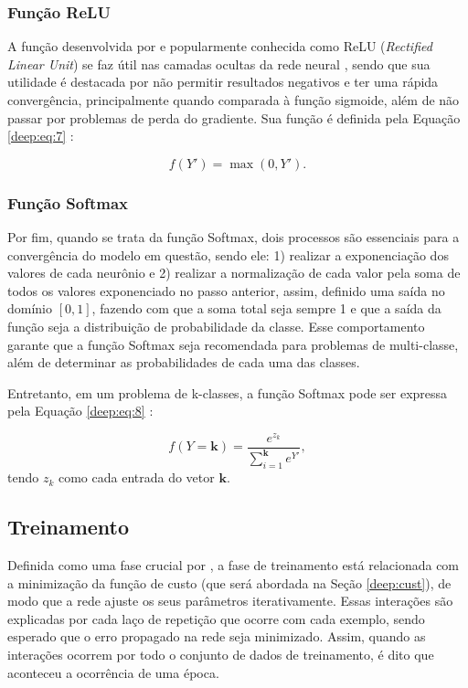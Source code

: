 \subsubsection{Função ReLU}
\label{deep:relu}
A função desenvolvida por \cite{Hahnioser2000} e popularmente conhecida como ReLU (\textit{Rectified Linear Unit}) se faz útil nas camadas ocultas da rede neural \citep{Goodfellow2016}, sendo que sua utilidade é destacada por não permitir resultados negativos \citep{Dahl2013} e ter uma rápida convergência, principalmente quando comparada à função sigmoide, além de não passar por problemas de perda do gradiente. Sua função é definida pela Equação \ref{deep:eq:7} \citep{Hahnioser2000}:

\begin{equation}
    \label{deep:eq:7}
    f(Y') = \max(0,Y').
\end{equation}

\subsubsection{Função Softmax}
\label{deep:soft}
Por fim, quando se trata da função Softmax, dois processos são essenciais para a convergência do modelo em questão, sendo ele: 1) realizar a exponenciação dos valores de cada neurônio e 2) realizar a normalização de cada valor pela soma de todos os valores exponenciado no passo anterior, assim, definido uma saída no domínio $[0,1]$, fazendo com que a soma total seja sempre 1 \citep{kotu2018data} e que a saída da função seja a distribuição de probabilidade da classe. Esse comportamento garante que a função Softmax seja recomendada para problemas de multi-classe, além de determinar as probabilidades de cada uma das classes.

Entretanto, em um problema de k-classes, a função Softmax pode ser expressa pela Equação \ref{deep:eq:8} \citep{kotu2018data}:

\begin{equation}
    \label{deep:eq:8}
    f(Y = \boldsymbol{k}) = \frac{e^{z_k}}{\sum_{i=1}^{\boldsymbol{k}} e^{Y'}},
\end{equation}
tendo $z_k$ como cada entrada do vetor $\boldsymbol{k}$.


\subsection{Treinamento}
\label{deep:train}

Definida como uma fase crucial por \cite{ponti2018funciona}, a fase de treinamento está relacionada com a minimização da função de custo (que será abordada na Seção \ref{deep:cust}), de modo que a rede ajuste os seus parâmetros iterativamente. Essas interações são explicadas por cada laço de repetição que ocorre com cada exemplo, sendo esperado que o erro propagado na rede seja minimizado. Assim, quando as interações ocorrem por todo o conjunto de dados de treinamento, é dito que aconteceu a ocorrência de uma época.

